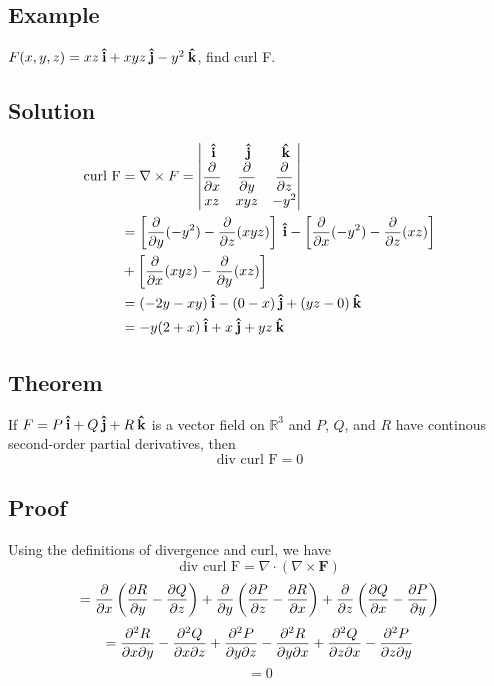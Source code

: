 \subsection*{Example}
$F(x,y,z)=xz\:\boldsymbol{\hat{\textbf{i}}}+xyz\:\boldsymbol{\hat{\textbf{j}}}-y^2\:\boldsymbol{\hat{\textbf{k}}}$, find curl F.

\subsection*{Solution}
\begin{align*}
        \text{curl F} & =\nabla \times F=\begin{vmatrix}
                \:\boldsymbol{\hat{\textbf{i}}}                        & \:\boldsymbol{\hat{\textbf{j}}}                        & \:\boldsymbol{\hat{\textbf{k}}}                        \\
                \dfrac{\partial}{\partial x} & \dfrac{\partial}{\partial y} & \dfrac{\partial}{\partial z} \\
                xz                           & xyz                          & -y^2
        \end{vmatrix}                                             \\
                      & =\left[\frac{\partial}{\partial y}(-y^2)-\frac{\partial}{\partial z}(xyz)\right]\:\boldsymbol{\hat{\textbf{i}}}-
        \left[\frac{\partial}{\partial x}(-y^2)-\frac{\partial}{\partial z}(xz)\right]                         \\
                      & +\left[\frac{\partial}{\partial x}(xyz)-\frac{\partial}{\partial y}(xz)\right]         \\
                      & =(-2y-xy)\:\boldsymbol{\hat{\textbf{i}}}-(0-x)\:\boldsymbol{\hat{\textbf{j}}}+(yz-0)\:\boldsymbol{\hat{\textbf{k}}}                                                  \\
                      & =-y(2+x)\:\boldsymbol{\hat{\textbf{i}}}+x\:\boldsymbol{\hat{\textbf{j}}}+yz\:\boldsymbol{\hat{\textbf{k}}}
\end{align*}

\subsection*{Theorem}
If $F=P\:\boldsymbol{\hat{\textbf{i}}}+Q\:\boldsymbol{\hat{\textbf{j}}}+R\:\boldsymbol{\hat{\textbf{k}}}$ is a vector field on $\mathbb{R}^3$ and $P$, $Q$, and $R$
have continous second-order partial derivatives, then
$$\text{div curl F}=0$$

\subsection*{Proof}
Using the definitions of divergence and curl, we have
$$\text{div curl F}=\nabla\cdot(\nabla\times \textbf{F})$$
$$=\frac{\partial}{\partial x}\left(\pdv{R}{y}-\pdv{Q}{z}\right)+
        \frac{\partial}{\partial y}\left(\pdv{P}{z}-\pdv{R}{x}\right)+
        \frac{\partial}{\partial z}\left(\pdv{Q}{x}-\pdv{P}{y}\right)$$
$$=\pdv{R}{x}{y}-\pdv{Q}{x}{z}+\pdv{P}{y}{z}-\pdv{R}{y}{x}+\pdv{Q}{z}{x}-\pdv{P}{z}{y}$$
$$=0$$

